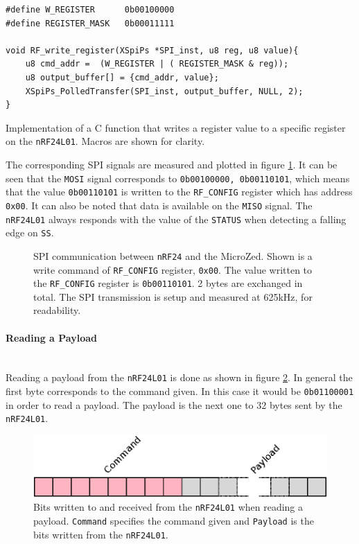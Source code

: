 \begin{listing}[!h]
\begin{verbatim}
#define W_REGISTER      0b00100000
#define REGISTER_MASK   0b00011111

void RF_write_register(XSpiPs *SPI_inst, u8 reg, u8 value){
	u8 cmd_addr =  (W_REGISTER | ( REGISTER_MASK & reg));
	u8 output_buffer[] = {cmd_addr, value};
	XSpiPs_PolledTransfer(SPI_inst, output_buffer, NULL, 2);
}
\end{verbatim}
\caption{Implementation of a C function that writes a register value to a specific register on the \texttt{nRF24L01}. Macros are shown for clarity.}
\label{code:rf_write_register_code}
\end{listing}

The corresponding SPI signals are measured and plotted in figure \ref{fig:nrf24_spi}.
It can be seen that the \texttt{MOSI} signal corresponds to \texttt{0b00100000, 0b00110101}, which means that the value \texttt{0b00110101} is written to the \texttt{RF\_CONFIG} register which has address \texttt{0x00}.
It can also be noted that data is available on the \texttt{MISO} signal. 
The \texttt{nRF24L01} always responds with the value of the \texttt{STATUS} when detecting a falling edge on \texttt{SS}.

\begin{figure}[h]
	\centering
	\caption[SPI communication between nRF24 and the MicroZed]{SPI communication between \texttt{nRF24} and the MicroZed. Shown is a write command of \texttt{RF\_CONFIG} register, \texttt{0x00}. The value written to the \texttt{RF\_CONFIG} register is \texttt{0b00110101}. 2 bytes are exchanged in total. The SPI transmission is setup and measured at 625kHz, for readability.}
	\label{fig:nrf24_spi}
\end{figure}

\paragraph{Reading a Payload} %
\label{par:reading_a_payload}
~\\
Reading a payload from the \texttt{nRF24L01} is done as shown in figure \ref{fig:rxtx_payload}.
In general the first byte corresponds to the command given. 
In this case it would be \texttt{0b01100001} in order to read a payload.
The payload is the next one to 32 bytes sent by the \texttt{nRF24L01}.
\begin{figure}[h]
	\centering
	\includegraphics[width=.6\linewidth]{graphics/rxtx_payload.eps}
	\caption[Reading a payload on the nRF24L01.]{Bits written to and received from the \texttt{nRF24L01} when reading a payload. \texttt{Command} specifies the command given and \texttt{Payload} is the bits written from the \texttt{nRF24L01}.}
	\label{fig:rxtx_payload}
\end{figure}

